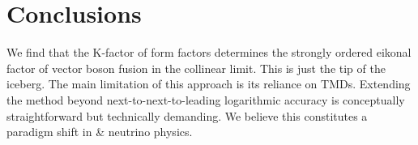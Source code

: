 \section{Conclusions}\label{sec:conclusions}

We find that the K-factor of form factors determines the strongly
ordered eikonal factor of vector boson fusion in the collinear limit.
This is just the tip of the iceberg. The main limitation of this
approach is its reliance on TMDs. Extending the method beyond
next-to-next-to-leading logarithmic accuracy is conceptually
straightforward but technically demanding. We believe this constitutes a
paradigm shift in & neutrino physics.

